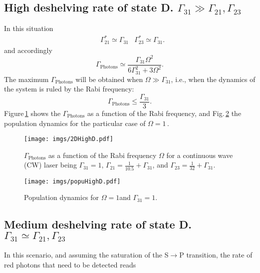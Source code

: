 \subsection{High deshelving rate of state D. $\Gamma_{31}\gg\Gamma_{21}, \Gamma_{23}$}
\label{HighD}

In this situation
\begin{align}
\label{Mod_relax_large}
& \Gamma_{21}^*\simeq\Gamma_{31}
& \Gamma_{23}^*\simeq\Gamma_{31}.
\end{align}
and accordingly
\begin{equation}
\Gamma_{\text{Photons}}\simeq\frac{\Gamma_{31}\Omega^2}{6\Gamma^2_{31}+3\Omega^2}.
\end{equation}
The maximum $\Gamma_{\text{Photons}}$ will be obtained when $\Omega\gg\Gamma_{31}$, i.e., when the dynamics of the system is ruled by the Rabi frequency:
\begin{equation}
\Gamma_{\text{Photons}}\leq\frac{\Gamma_{31}}{3}.
\end{equation}
Figure\,\ref{2DHighD} shows the $\Gamma_{\text{Photons}}$ as a function of the Rabi frequency, and Fig.\,\ref{popuHighD} the population dynamics for the particular case of $\Omega=1$\,\ns.

\begin{figure}[ht!]
\begin{center}
\texttt{[image: imgs/2DHighD.pdf]}
\caption{\label{2DHighD} $\Gamma_{\text{Photons}}$ as a function of the Rabi frequency $\Omega$ for a continuous wave (CW) laser being $\Gamma_{31}=1$\ns, $\Gamma_{21}=\frac{1}{10.5}+\Gamma_{31}$\ns, and $\Gamma_{23}=\frac{1}{32}+\Gamma_{31}$\ns. }
\end{center}
\end{figure}

\begin{figure}[ht!]
\begin{center}
\texttt{[image: imgs/popuHighD.pdf]}
\caption{\label{popuHighD} Population dynamics for $\Omega=1$\ns and  $\Gamma_{31}=1$\ns.}
\end{center}
\end{figure}

\subsection{Medium deshelving rate of state D. $\Gamma_{31}\simeq\Gamma_{21}, \Gamma_{23}$}

In this scenario, and assuming the saturation of the S$\rightarrow$P transition, the rate of red photons that need to be detected reads


